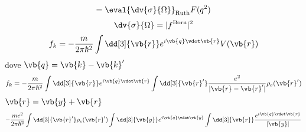 \begin{soluzione}
\begin{equation*}
      =\eval{\dv{\sigma}{\Omega}}_{\rm Ruth} F(q^2)
   \end{equation*}
   \begin{equation*}
      \dv{\sigma}{\Omega}
      =|f^{\rm Born}|^2
   \end{equation*}
   \begin{equation*}
      f_k
      =-\frac{m}{2 \pi \hbar^2} \int \dd[3]{\vb{r}} e^{i \vb{q} \vdot \vb{r}} V(\vb{r})
   \end{equation*}
   dove $\vb{q}=\vb{k} - \vb{k}'$
   \begin{equation*}
      f_k
      =-\frac{m}{2 \pi \hbar^2} \int \dd[3]{\vb{r}} e^{i \vb{q} \vdot \vb{r}} \int \dd[3]{\vb{r}'} \frac{e^2}{| \vb{r} - \vb{r}' |} \rho_e(\vb{r}')
   \end{equation*}
   $\vb{r}=\vb{y} + \vb{r}$
   \begin{equation*}
      -\frac{m e^2}{2 \pi \hbar^2} \int \dd[3]{\vb{r}'} \rho_e(\vb{r}') \int \dd[3]{\vb{y}} e^{i \vb{q} \vdot \vb{y}} \int \dd[3]{\vb{r}} \frac{e^{i \vb{q} \vdot \vb{r}}}{| \vb{y} |}
   \end{equation*}
\end{soluzione}

\newpage
\setcounter{equation}{0}

